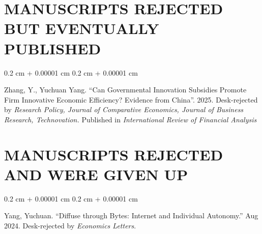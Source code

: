 \documentclass[10pt, letterpaper]{article}
\newenvironment{onecolentry}{
    \begin{adjustwidth}{
        0.2 cm + 0.00001 cm
    }{
        0.2 cm + 0.00001 cm
    }
}{
    \end{adjustwidth}
} %
\newenvironment{paper}{\vspace{.2cm}\begin{samepage}\begin{onecolentry}}{\end{onecolentry}\end{samepage}\vspace{0.2cm}}
\begin{document}
\section{MANUSCRIPTS REJECTED BUT EVENTUALLY PUBLISHED}

\begin{paper}
	Zhang, Y., Yuchuan Yang. ``Can Governmental Innovation Subsidies Promote Firm Innovative Economic Efficiency? Evidence from China''. 2025. Desk-rejected by \textit{Research Policy, Journal of Comparative Economics, Journal of Business Research, Technovation.} Published in \textit{International Review of Financial Analysis}
\end{paper}




\section{MANUSCRIPTS REJECTED AND WERE GIVEN UP}

\begin{paper}
Yang, Yuchuan. ``Diffuse through Bytes: Internet and Individual Autonomy.'' Aug 2024. Desk-rejected by \textit{Economics Letters}.
\end{paper}
\end{document}
